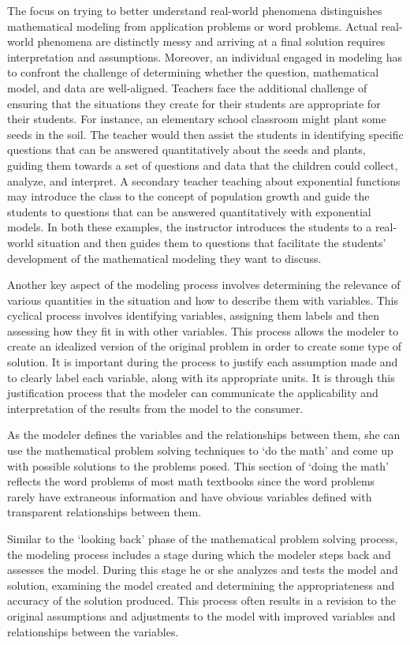 \documentclass[
]{book}
\theoremstyle{definition}
\theoremstyle{definition}
\theoremstyle{definition}
\theoremstyle{definition}
\theoremstyle{remark}
\begin{document}
The focus on trying to better understand real-world phenomena distinguishes mathematical modeling from application problems or word problems. Actual real-world phenomena are distinctly messy and arriving at a final solution requires interpretation and assumptions. Moreover, an individual engaged in modeling has to confront the challenge of determining whether the question, mathematical model, and data are well-aligned. Teachers face the additional challenge of ensuring that the situations they create for their students are appropriate for their students. For instance, an elementary school classroom might plant some seeds in the soil. The teacher would then assist the students in identifying specific questions that can be answered quantitatively about the seeds and plants, guiding them towards a set of questions and data that the children could collect, analyze, and interpret. A secondary teacher teaching about exponential functions may introduce the class to the concept of population growth and guide the students to questions that can be answered quantitatively with exponential models. In both these examples, the instructor introduces the students to a real-world situation and then guides them to questions that facilitate the students' development of the mathematical modeling they want to discuss.

Another key aspect of the modeling process involves determining the relevance of various quantities in the situation and how to describe them with variables. This cyclical process involves identifying variables, assigning them labels and then assessing how they fit in with other variables. This process allows the modeler to create an idealized version of the original problem in order to create some type of solution. It is important during the process to justify each assumption made and to clearly label each variable, along with its appropriate units. It is through this justification process that the modeler can communicate the applicability and interpretation of the results from the model to the consumer.

As the modeler defines the variables and the relationships between them, she can use the mathematical problem solving techniques to `do the math' and come up with possible solutions to the problems posed. This section of `doing the math' reflects the word problems of most math textbooks since the word problems rarely have extraneous information and have obvious variables defined with transparent relationships between them.

Similar to the `looking back' phase of the mathematical problem solving process, the modeling process includes a stage during which the modeler steps back and assesses the model. During this stage he or she analyzes and tests the model and solution, examining the model created and determining the appropriateness and accuracy of the solution produced. This process often results in a revision to the original assumptions and adjustments to the model with improved variables and relationships between the variables.
\end{document}
